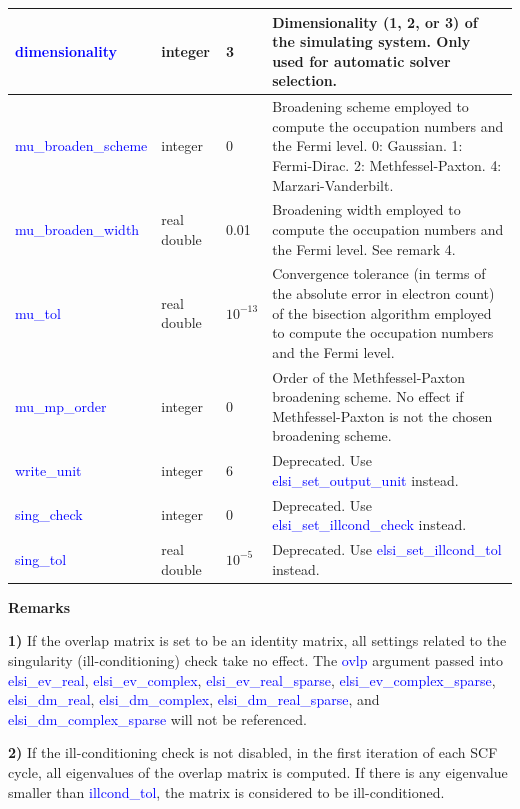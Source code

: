 \documentclass{report}
\begin{document}
\begin{tabular}[]{|p{30mm}|p{20mm}|p{15mm}|p{100mm}|}
\hline
\textcolor{blue}{dimensionality}      & integer            & 3           & Dimensionality (1, 2, or 3) of the simulating system.  Only used for automatic solver selection.\\
\hline
\textcolor{blue}{mu\_broaden\_scheme} & integer            & 0           & Broadening scheme employed to compute the occupation numbers and the Fermi level.  0:  Gaussian.  1:  Fermi-Dirac.  2:  Methfessel-Paxton.  4:  Marzari-Vanderbilt.\\
\hline
\textcolor{blue}{mu\_broaden\_width}  & real double        & 0.01        & Broadening width employed to compute the occupation numbers and the Fermi level.  See remark 4.\\
\hline
\textcolor{blue}{mu\_tol}             & real double        & $10^{-13}$  & Convergence tolerance (in terms of the absolute error in electron count) of the bisection algorithm employed to compute the occupation numbers and the Fermi level.\\
\hline
\textcolor{blue}{mu\_mp\_order}       & integer            & 0           & Order of the Methfessel-Paxton broadening scheme.  No effect if Methfessel-Paxton is not the chosen broadening scheme.\\
\hline
\textcolor{blue}{write\_unit}         & integer            & 6           & Deprecated.  Use \textcolor{blue}{elsi\_set\_output\_unit} instead.\\
\hline
\textcolor{blue}{sing\_check}         & integer            & 0           & Deprecated.  Use \textcolor{blue}{elsi\_set\_illcond\_check} instead.\\
\hline
\textcolor{blue}{sing\_tol}           & real double        & $10^{-5}$   & Deprecated.  Use \textcolor{blue}{elsi\_set\_illcond\_tol} instead.\\
\hline
\end{tabular}

\textbf{Remarks}

\textbf{1)} If the overlap matrix is set to be an identity matrix, all settings related to the singularity (ill-conditioning) check take no effect.  The \textcolor{blue}{ovlp} argument passed into \textcolor{blue}{elsi\_ev\_real}, \textcolor{blue}{elsi\_ev\_complex}, \textcolor{blue}{elsi\_ev\_real\_sparse}, \textcolor{blue}{elsi\_ev\_complex\_sparse}, \textcolor{blue}{elsi\_dm\_real}, \textcolor{blue}{elsi\_dm\_complex}, \textcolor{blue}{elsi\_dm\_real\_sparse}, and \textcolor{blue}{elsi\_dm\_complex\_sparse} will not be referenced.

\textbf{2)} If the ill-conditioning check is not disabled, in the first iteration of each SCF cycle, all eigenvalues of the overlap matrix is computed.  If there is any eigenvalue smaller than \textcolor{blue}{illcond\_tol}, the matrix is considered to be ill-conditioned.
\end{document}
